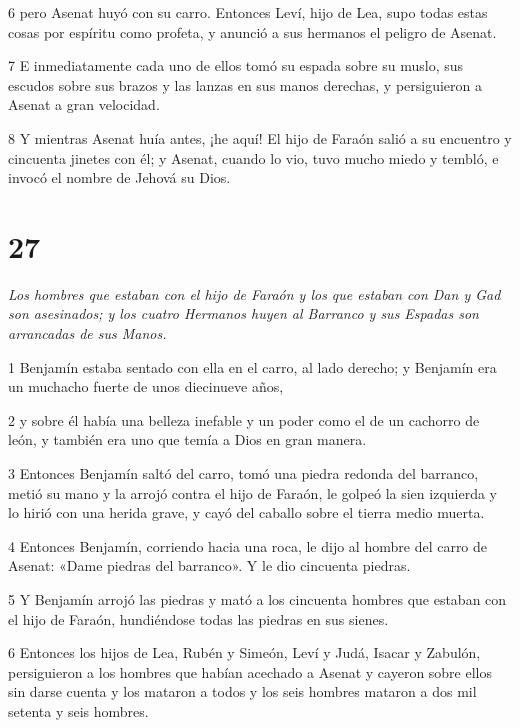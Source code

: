 \par 6 pero Asenat huyó con su carro. Entonces Leví, hijo de Lea, supo todas estas cosas por espíritu como profeta, y anunció a sus hermanos el peligro de Asenat.

\par 7 E inmediatamente cada uno de ellos tomó su espada sobre su muslo, sus escudos sobre sus brazos y las lanzas en sus manos derechas, y persiguieron a Asenat a gran velocidad.

\par 8 Y mientras Asenat huía antes, ¡he aquí! El hijo de Faraón salió a su encuentro y cincuenta jinetes con él; y Asenat, cuando lo vio, tuvo mucho miedo y tembló, e invocó el nombre de Jehová su Dios.

\chapter{27}

\par \textit{Los hombres que estaban con el hijo de Faraón y los que estaban con Dan y Gad son asesinados; y los cuatro Hermanos huyen al Barranco y sus Espadas son arrancadas de sus Manos.}


\par 1 Benjamín estaba sentado con ella en el carro, al lado derecho; y Benjamín era un muchacho fuerte de unos diecinueve años,

\par 2 y sobre él había una belleza inefable y un poder como el de un cachorro de león, y también era uno que temía a Dios en gran manera.

\par 3 Entonces Benjamín saltó del carro, tomó una piedra redonda del barranco, metió su mano y la arrojó contra el hijo de Faraón, le golpeó la sien izquierda y lo hirió con una herida grave, y cayó del caballo sobre el tierra medio muerta.

\par 4 Entonces Benjamín, corriendo hacia una roca, le dijo al hombre del carro de Asenat: «Dame piedras del barranco». Y le dio cincuenta piedras.

\par 5 Y Benjamín arrojó las piedras y mató a los cincuenta hombres que estaban con el hijo de Faraón, hundiéndose todas las piedras en sus sienes.

\par 6 Entonces los hijos de Lea, Rubén y Simeón, Leví y Judá, Isacar y Zabulón, persiguieron a los hombres que habían acechado a Asenat y cayeron sobre ellos sin darse cuenta y los mataron a todos y los seis hombres mataron a dos mil setenta y seis hombres.

